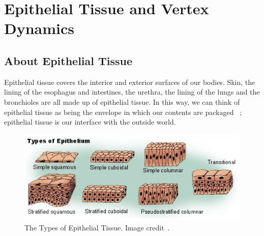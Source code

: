 \chapter{Epithelial Tissue and Vertex Dynamics}
\label{chap:intro}
\section{About Epithelial Tissue}
Epithelial tissue covers the interior and exterior surfaces of our bodies. Skin, the lining of the esophagus and intestines, the urethra, the lining of the lungs and the bronchioles are all made up of epithelial tissue. In this way, we can think of epithelial tissue as being the envelope in which our contents are packaged ~\cite{ShapeFormation}; epithelial tissue is our interface with the outside world. 

\begin{figure}[hb]
\centering \includegraphics[width=\textwidth]{../diagrams/output.png}
\caption{The Types of Epithelial Tissue. Image credit~\cite{Epithelium}.}
\label{fig:types}
\end{figure}

